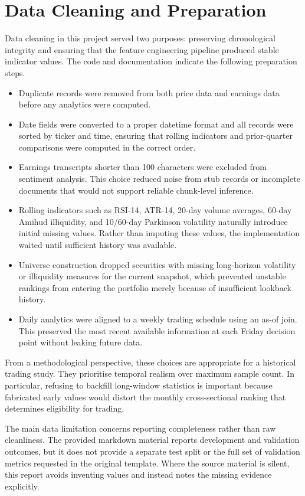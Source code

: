 \documentclass[11pt,twoside,a4paper]{article}
\begin{document}
\section{Data Cleaning and Preparation}
Data cleaning in this project served two purposes: preserving chronological integrity and ensuring that the feature engineering pipeline produced stable indicator values. The code and documentation indicate the following preparation steps.

\begin{itemize}
    \item Duplicate records were removed from both price data and earnings data before any analytics were computed.
    \item Date fields were converted to a proper datetime format and all records were sorted by ticker and time, ensuring that rolling indicators and prior-quarter comparisons were computed in the correct order.
    \item Earnings transcripts shorter than 100 characters were excluded from sentiment analysis. This choice reduced noise from stub records or incomplete documents that would not support reliable chunk-level inference.
    \item Rolling indicators such as RSI-14, ATR-14, 20-day volume averages, 60-day Amihud illiquidity, and 10/60-day Parkinson volatility naturally introduce initial missing values. Rather than imputing these values, the implementation waited until sufficient history was available.
    \item Universe construction dropped securities with missing long-horizon volatility or illiquidity measures for the current snapshot, which prevented unstable rankings from entering the portfolio merely because of insufficient lookback history.
    \item Daily analytics were aligned to a weekly trading schedule using an as-of join. This preserved the most recent available information at each Friday decision point without leaking future data.
\end{itemize}

From a methodological perspective, these choices are appropriate for a historical trading study. They prioritise temporal realism over maximum sample count. In particular, refusing to backfill long-window statistics is important because fabricated early values would distort the monthly cross-sectional ranking that determines eligibility for trading.

The main data limitation concerns reporting completeness rather than raw cleanliness. The provided markdown material reports development and validation outcomes, but it does not provide a separate test split or the full set of validation metrics requested in the original template. Where the source material is silent, this report avoids inventing values and instead notes the missing evidence explicitly.
\end{document}
